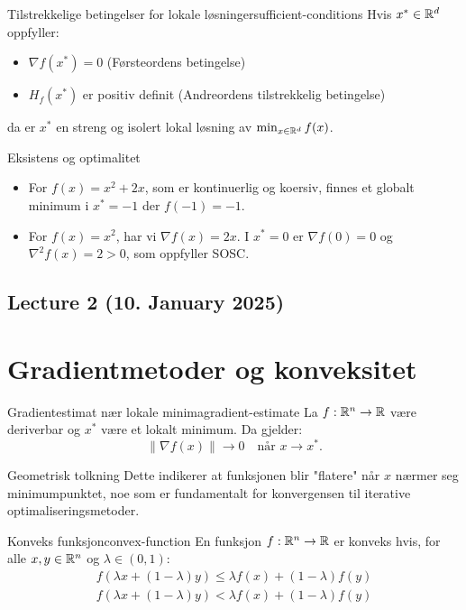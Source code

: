 \begin{theorem}{Tilstrekkelige betingelser for lokale løsninger}{sufficient-conditions}
  Hvis  \(x^* \in \mathbb{R}^d\) oppfyller:
  \begin{itemize}
    \item  \(\nabla f(x^*) = 0\) (Førsteordens betingelse)
    \item  \(H_f(x^*)\) er positiv definit (Andreordens tilstrekkelig betingelse)
  \end{itemize}
  da er  \(x^*\) en streng og isolert lokal løsning av  \(\min_{x \in \mathbb{R}^d} f(x)\).
\end{theorem}\label{thm:sufficient-conditions}

\begin{example}{Eksistens og optimalitet}{}
  \begin{itemize}
    \item For \( f(x) = x^2 + 2x \), som er kontinuerlig og koersiv, finnes et globalt minimum i \( x^* = -1 \) der \( f(-1) = -1 \).
    \item For \( f(x) = x^2 \), har vi \( \nabla f(x) = 2x \). I \( x^* = 0 \) er \( \nabla f(0) = 0 \) og \( \nabla^2 f(x) = 2 > 0 \), som oppfyller SOSC.
  \end{itemize}
\end{example}

\subsection{Lecture 2 (10. January 2025)}

\section*{Gradientmetoder og konveksitet}

\begin{theorem}{Gradientestimat nær lokale minima}{gradient-estimate}
  La  \(f: \mathbb{R}^n \to \mathbb{R}\) være deriverbar og  \(x^*\) være et lokalt minimum. Da gjelder:
  \[
    \|\nabla f(x)\| \to 0 \quad \text{når } x \to x^*.
  \]
\end{theorem}

\begin{remark}{Geometrisk tolkning}
  Dette indikerer at funksjonen blir "flatere" når  \(x\) nærmer seg minimumpunktet, noe som er fundamentalt for konvergensen til iterative optimaliseringsmetoder.
\end{remark}

\begin{definition}{Konveks funksjon}{convex-function}
  En funksjon  \(f: \mathbb{R}^n \to \mathbb{R}\) er konveks hvis, for alle  \(x, y \in \mathbb{R}^n\) og  \(\lambda \in (0,1)\):
  \begin{align*}
    f(\lambda x + (1 - \lambda)y) \leq \lambda f(x) + (1 - \lambda)f(y) \tag{Konveks} \\
    f(\lambda x + (1 - \lambda)y) < \lambda f(x) + (1 - \lambda)f(y) \tag{Strengt konveks}
  \end{align*}

\end{definition}

